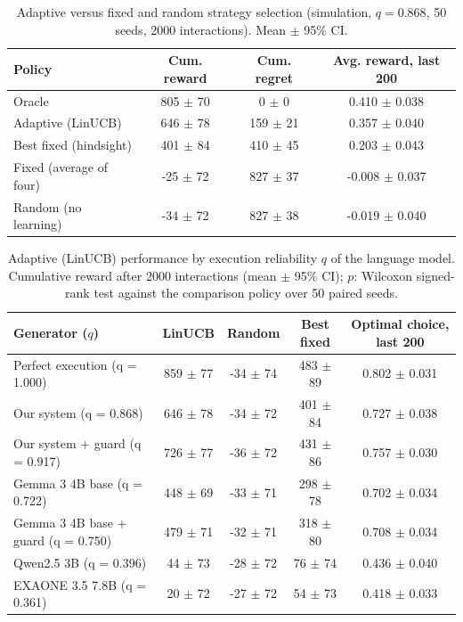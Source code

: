 \begin{table}[t]
\caption{Adaptive versus fixed and random strategy selection (simulation, $q=0.868$, 50 seeds, 2000 interactions). Mean $\pm$ 95\% CI.}
\label{tab:adaptation_main}
\centering
\small
\begin{tabular}{p{}ccc}
\hline
\textbf{Policy} & \textbf{Cum. reward} & \textbf{Cum. regret} & \textbf{Avg. reward, last 200} \\
\hline
Oracle & 805 $\pm$ 70 & 0 $\pm$ 0 & 0.410 $\pm$ 0.038 \\
Adaptive (LinUCB) & 646 $\pm$ 78 & 159 $\pm$ 21 & 0.357 $\pm$ 0.040 \\
Best fixed (hindsight) & 401 $\pm$ 84 & 410 $\pm$ 45 & 0.203 $\pm$ 0.043 \\
Fixed (average of four) & -25 $\pm$ 72 & 827 $\pm$ 37 & -0.008 $\pm$ 0.037 \\
Random (no learning) & -34 $\pm$ 72 & 827 $\pm$ 38 & -0.019 $\pm$ 0.040 \\
\hline
\end{tabular}
\end{table}

\begin{table}[t]
\caption{Adaptive (LinUCB) performance by execution reliability $q$ of the language model. Cumulative reward after 2000 interactions (mean $\pm$ 95\% CI); $p$: Wilcoxon signed-rank test against the comparison policy over 50 paired seeds.}
\label{tab:adaptation_q}
\centering
\footnotesize
\begin{tabular}{p{}cccc}
\hline
\textbf{Generator ($q$)} & \textbf{LinUCB} & \textbf{Random} & \textbf{Best fixed} & \textbf{Optimal choice, last 200} \\
\hline
Perfect execution (q = 1.000) & 859 $\pm$ 77 & -34 $\pm$ 74 & 483 $\pm$ 89 & 0.802 $\pm$ 0.031 \\
Our system (q = 0.868) & 646 $\pm$ 78 & -34 $\pm$ 72 & 401 $\pm$ 84 & 0.727 $\pm$ 0.038 \\
Our system + guard (q = 0.917) & 726 $\pm$ 77 & -36 $\pm$ 72 & 431 $\pm$ 86 & 0.757 $\pm$ 0.030 \\
Gemma 3 4B base (q = 0.722) & 448 $\pm$ 69 & -33 $\pm$ 71 & 298 $\pm$ 78 & 0.702 $\pm$ 0.034 \\
Gemma 3 4B base + guard (q = 0.750) & 479 $\pm$ 71 & -32 $\pm$ 71 & 318 $\pm$ 80 & 0.708 $\pm$ 0.034 \\
Qwen2.5 3B (q = 0.396) & 44 $\pm$ 73 & -28 $\pm$ 72 & 76 $\pm$ 74 & 0.436 $\pm$ 0.040 \\
EXAONE 3.5 7.8B (q = 0.361) & 20 $\pm$ 72 & -27 $\pm$ 72 & 54 $\pm$ 73 & 0.418 $\pm$ 0.033 \\
\hline
\end{tabular}
\end{table}

